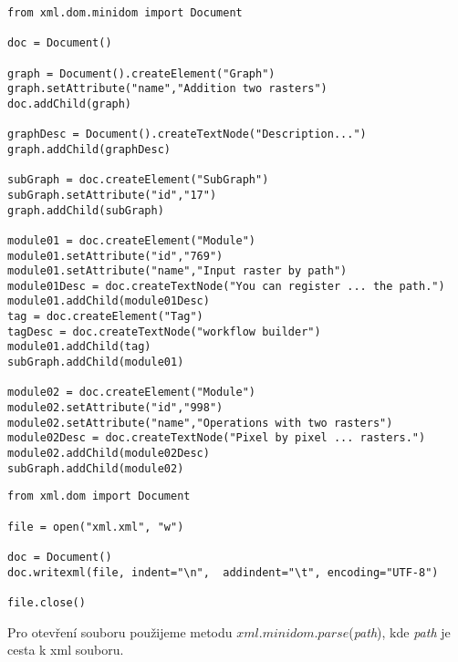 \newpage
\begin{lstlisting}[label=xml:xml,caption={ukázka tvorby XML dokumentu z [\autoref{xml:example}]}, morekeywords={Document, createElement, setAttribute, createTextNode, addChild}]
from xml.dom.minidom import Document

doc = Document()

graph = Document().createElement("Graph")
graph.setAttribute("name","Addition two rasters")
doc.addChild(graph)

graphDesc = Document().createTextNode("Description...")
graph.addChild(graphDesc)

subGraph = doc.createElement("SubGraph")
subGraph.setAttribute("id","17")
graph.addChild(subGraph)

module01 = doc.createElement("Module")
module01.setAttribute("id","769")
module01.setAttribute("name","Input raster by path")
module01Desc = doc.createTextNode("You can register ... the path.")
module01.addChild(module01Desc)
tag = doc.createElement("Tag")
tagDesc = doc.createTextNode("workflow builder")
module01.addChild(tag)
subGraph.addChild(module01)

module02 = doc.createElement("Module")
module02.setAttribute("id","998")
module02.setAttribute("name","Operations with two rasters")
module02Desc = doc.createTextNode("Pixel by pixel ... rasters.")
module02.addChild(module02Desc)
subGraph.addChild(module02)
\end{lstlisting}

\newpage
\begin{lstlisting}[label=xml:save,caption={uložení XML dokumentu do souboru}]
from xml.dom import Document

file = open("xml.xml", "w")

doc = Document()
doc.writexml(file, indent="\n",  addindent="\t", encoding="UTF-8")

file.close()

\end{lstlisting}

Pro otevření souboru použijeme metodu $xml.minidom.parse$(\textit{path}), kde \textit{path} je cesta k xml souboru.

%

